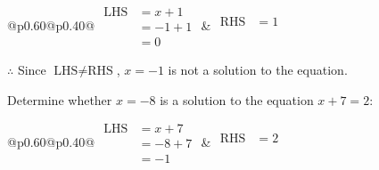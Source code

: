 \documentclass[12pt]{article}
\newcounter{minipagecount}
\begin{document}
\begin{multicols}{2}
\begin{minipage}[t]{0.40\textwidth}
    \noindent
    \renewcommand{\arraystretch}{1.3} %
    \begin{tabular}{@{}p{0.60\linewidth}@{}p{0.40\linewidth}@{}}
        \(\begin{aligned}
            \text{LHS} &= x + 1 \\
                    &= -1 + 1 \\
                    &= 0 
        \end{aligned}\) &
        \(\begin{aligned}
            \text{RHS} &= 1\\
                    & \\
                    &
        \end{aligned}\)
    \end{tabular}
    \renewcommand{\arraystretch}{1.0} %
    \vspace{2pt}  %

    \noindent \(\therefore\) Since \(\text{LHS} \neq \text{RHS}\), \(x = -1\) is not  a solution to the equation.

\end{minipage}

\vspace*{0.5ex}
\vfill{}
\noindent{(\theminipagecount)}\hspace{0.1mm} %
\begin{minipage}[t]{0.40\textwidth} %

    \noindent Determine whether \(x = -8\) is a solution to the equation \(x + 7 = 2\):
    \vspace{2pt}  %

    \noindent
    \renewcommand{\arraystretch}{1.3} %
    \begin{tabular}{@{}p{0.60\linewidth}@{}p{0.40\linewidth}@{}}
        \(\begin{aligned}
            \text{LHS} &= x + 7 \\
                    &= -8 + 7 \\
                    &= -1 
        \end{aligned}\) &
        \(\begin{aligned}
            \text{RHS} &= 2\\
                    & \\
                    &
        \end{aligned}\)
    \end{tabular}
    \renewcommand{\arraystretch}{1.0} %
    \vspace{2pt}  %


\end{minipage}
\end{multicols}
\end{document}
